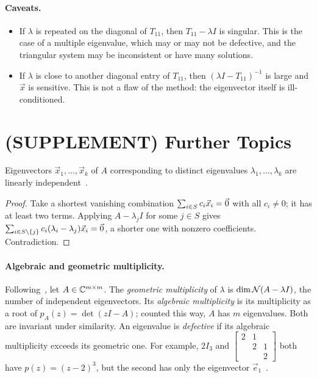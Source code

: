 \paragraph{Caveats.}
\begin{itemize}
  \item If $\lambda$ is repeated on the diagonal of $T_{11}$, then $T_{11} - \lambda I$ is singular. This is the case of a multiple eigenvalue, which may or may not be defective, and the triangular system may be inconsistent or have many solutions.
  \item If $\lambda$ is close to another diagonal entry of $T_{11}$, then $(\lambda I - T_{11})^{-1}$ is large and $\vec{x}$ is sensitive. This is not a flaw of the method: the eigenvector itself is ill-conditioned.
\end{itemize}

\clearpage
\section{(SUPPLEMENT) Further Topics}
\label{sec:schur-supp}

\begin{lemma}
  \label{lem:distinct-indep}
  Eigenvectors $\vec{x}_1, \dots, \vec{x}_k$ of $A$ corresponding to distinct eigenvalues $\lambda_1, \dots, \lambda_k$ are linearly independent~\cite[5.11]{Axler}.
\end{lemma}

\begin{proof}
  Take a shortest vanishing combination $\sum_{i \in S}c_i\vec{x}_i = \vec{0}$ with all $c_i \ne 0$; it has at least two terms. Applying $A - \lambda_jI$ for some $j \in S$ gives $\sum_{i \in S \setminus \{j\}}c_i(\lambda_i - \lambda_j)\vec{x}_i = \vec{0}$, a shorter one with nonzero coefficients. Contradiction.
\end{proof}

\paragraph{Algebraic and geometric multiplicity.}
\label{sec:multiplicity}
Following~\cite[Lecture~24]{TB}, let $A \in \mathbb{C}^{m \times m}$. The \emph{geometric multiplicity} of $\lambda$ is $\dim\mathcal{N}(A - \lambda I)$, the number of independent eigenvectors. Its \emph{algebraic multiplicity} is its multiplicity as a root of $p_A(z) = \det(zI - A)$; counted this way, $A$ has $m$ eigenvalues. Both are invariant under similarity. An eigenvalue is \emph{defective} if its algebraic multiplicity exceeds its geometric one. For example, $2I_3$ and $\left[\begin{smallmatrix} 2 & 1 & \\ & 2 & 1 \\ & & 2 \end{smallmatrix}\right]$ both have $p(z) = (z - 2)^3$, but the second has only the eigenvector $\vec{e}_1$~\cite[Ex.~24.1]{TB}.

